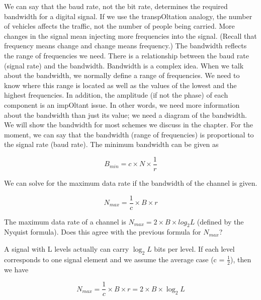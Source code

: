 We can say that the baud rate, not the bit rate, determines the required bandwidth for a digital signal. If we use the transpOltation analogy, the number of vehicles affects the traffic, not the number of people being carried. More changes in the signal mean injecting more frequencies into the signal. (Recall that frequency means change and change means frequency.) The bandwidth reflects the range of frequencies we need. There is a relationship between the baud rate (signal rate) and the bandwidth. Bandwidth is a complex idea. When we talk about the bandwidth, we normally define a range of frequencies. We need to know where this range is located as well as the values of the lowest and the highest frequencies. In addition, the amplitude (if not the phase) of each component is an impOltant issue. In other words, we need more information about the bandwidth than just its value; we need a diagram of the bandwidth. We will show the bandwidth for most schemes we discuss in the chapter. For the moment, we can say that the bandwidth (range of frequencies) is proportional to the signal rate (baud rate). The minimum bandwidth can be given as

\begin{equation}
  B_{min} = c \times N \times \frac{1}{r}
\end{equation}

We can solve for the maximum data rate if the bandwidth of the channel is given.

\begin{equation}
  N_{max} = \frac{1}{c} \times B \times r
\end{equation}

\vspace{12pt}

\begin{example}
  The maximum data rate of a channel is $N_{max} = 2 \times B \times log_2L$ (defined by the Nyquist formula). Does this agree with the previous formula for $N_{max}$?
\end{example}

\begin{solution}
  A signal with L levels actually can carry $\log_2L$ bits per level. If each level corresponds to one signal element and we assume the average case (c = $\frac{1}{2}$), then we have

  \begin{equation*}
    N_{max} = \frac{1}{c} \times B \times r = 2 \times B \times \log_2L
  \end{equation*}
\end{solution}

